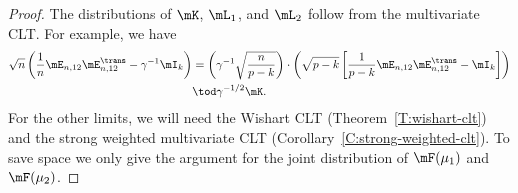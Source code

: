 \begin{proof}
    The distributions of $\mK$, $\mL_1$, and $\mL_2$ follow from the 
    multivariate CLT.  For example, we have
    \begin{align*}
        \sqrt{n}
        \left(
            \frac{1}{n} \mE_{n,12} \mE_{n,12}^\trans
            -
            \gamma^{-1}
            \mI_k
        \right)
            &=
                \left(
                    \gamma^{-1}
                    \sqrt{ \frac{ n }{ p - k } }
                \right)
                \cdot
                \left(
                    \sqrt{ p - k }
                    \left[
                        \frac{1}{p-k}
                        \mE_{n,12} \mE_{n,12}^\trans
                        -
                        \mI_k
                    \right]
                \right) \\
            &\tod
                \gamma^{-1/2}
                \mK.
    \end{align*}
    For the other limits, we will need the Wishart CLT 
    (Theorem~\ref{T:wishart-clt}) and the strong weighted multivariate CLT
    (Corollary~\ref{C:strong-weighted-clt}).  To save space we only
    give the argument for the joint distribution of $\mF(\mu_1)$ and 
    $\mF(\mu_2)$.
    

\end{proof}
